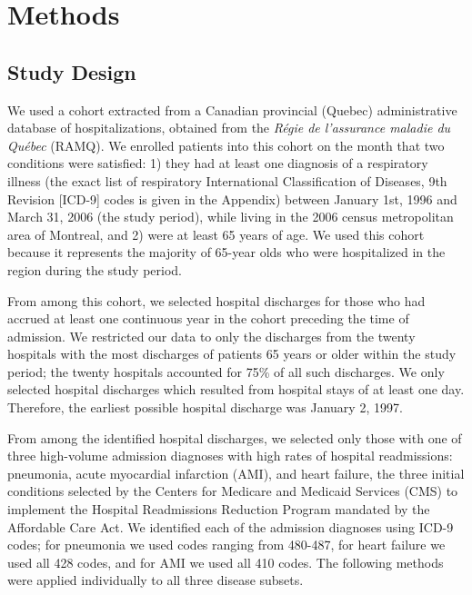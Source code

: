 \documentclass[]{article}\usepackage[]{graphicx}\usepackage[]{color}
\begin{document}
\section{Methods}

\subsection{Study Design}
We used a cohort extracted from a Canadian provincial (Quebec) administrative database of hospitalizations, obtained from the \emph{Régie de l'assurance maladie du Québec} (RAMQ). We enrolled patients into this cohort on the month that two conditions were satisfied: 1) they had at least one diagnosis of a respiratory illness (the exact list of respiratory International Classification of Diseases, 9th Revision [ICD-9] codes is given in the Appendix) between January 1st, 1996 and March 31, 2006 (the study period), while living in the 2006 census metropolitan area of Montreal, and 2) were at least 65 years of age. We used this cohort because it represents the majority of 65-year olds who were hospitalized in the region during the study period.

From among this cohort, we selected hospital discharges for those who had accrued at least one continuous year in the cohort preceding the time of admission. We restricted our data to only the discharges from the twenty hospitals with the most discharges of patients 65 years or older within the study period; the twenty hospitals accounted for 75\% of all such discharges.  We only selected hospital discharges which resulted from hospital stays of at least one day. Therefore, the
earliest possible hospital discharge was January 2, 1997.

From among the identified hospital discharges, we selected only those with one of three high-volume admission diagnoses with high rates of hospital readmissions: pneumonia, acute myocardial infarction (AMI), and heart failure, the three initial conditions selected by the Centers for Medicare and Medicaid Services (CMS) to implement the Hospital Readmissions Reduction Program mandated by the Affordable Care Act. We identified each of the admission diagnoses using ICD-9 codes; for pneumonia we used codes ranging from 480-487, for heart failure we used all 428 codes, and for AMI we used all 410 codes. The following methods were applied individually to all three disease subsets.
\end{document}
